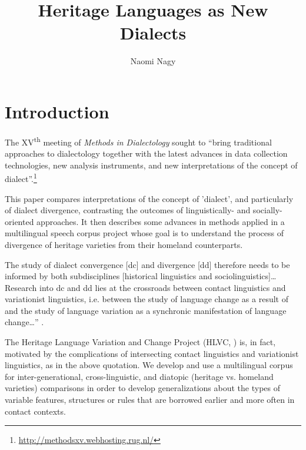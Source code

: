 \documentclass[output=paper]{LSP/langsci}
\author{Naomi Nagy\affiliation{University of Toronto, Department of Linguistics }}
\title{Heritage Languages as New Dialects}
\begin{document}

\section{Introduction}
The XV\textsuperscript{th} meeting of \textit{Methods in Dialectology} sought to “bring traditional approaches to dialectology together with the latest advances in data collection technologies, new analysis instruments, and new interpretations of the concept of dialect”.\footnote{\url{http://methodsxv.webhosting.rug.nl/}}

This paper compares interpretations of the concept of 'dialect', and particularly of dialect divergence, contrasting the outcomes of linguistically- and socially-oriented approaches. It then describes some advances in methods applied in a multilingual speech corpus project whose goal is to understand the process of divergence of heritage varieties from their homeland counterparts.

The study of dialect convergence [dc] and divergence [dd] therefore needs to be informed by both subdisciplines [historical linguistics and sociolinguistics]… Research into dc and dd lies at the crossroads between contact linguistics and variationist linguistics, i.e. between the study of language change as a result of  and the study of language variation as a synchronic manifestation of language change…” \citep[16]{auer_study_2004}.

The Heritage Language Variation and Change Project (HLVC, \citealt{nagy_multilingual_2011}) is, in fact, motivated by the complications of intersecting contact linguistics and variationist linguistics, as in the above quotation. We develop and use a multilingual corpus for inter-generational, cross-linguistic, and diatopic (heritage vs. homeland varieties) comparisons in order to develop generalizations about the types of variable features, structures or rules that are borrowed earlier and more often in contact contexts.  
\end{document}
